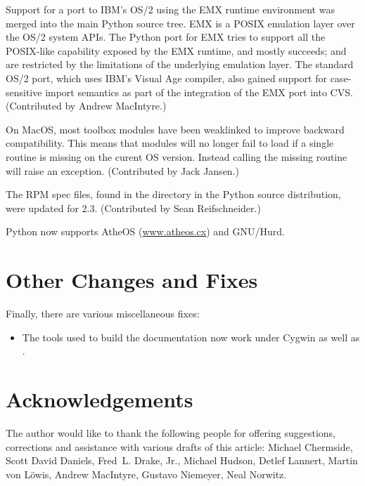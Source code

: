 \documentclass{howto}
\begin{document}
Support for a port to IBM's OS/2 using the EMX runtime environment was
merged into the main Python source tree.  EMX is a POSIX emulation
layer over the OS/2 system APIs.  The Python port for EMX tries to
support all the POSIX-like capability exposed by the EMX runtime, and
mostly succeeds;  and  are
restricted by the limitations of the underlying emulation layer.  The
standard OS/2 port, which uses IBM's Visual Age compiler, also gained
support for case-sensitive import semantics as part of the integration
of the EMX port into CVS.  (Contributed by Andrew MacIntyre.)

On MacOS, most toolbox modules have been weaklinked to improve
backward compatibility.  This means that modules will no longer fail
to load if a single routine is missing on the curent OS version.
Instead calling the missing routine will raise an exception.
(Contributed by Jack Jansen.)

The RPM spec files, found in the  directory in the
Python source distribution, were updated for 2.3.  (Contributed by
Sean Reifschneider.)

Python now supports AtheOS (\url{www.atheos.cx}) and GNU/Hurd.


\section{Other Changes and Fixes}

Finally, there are various miscellaneous fixes:

\begin{itemize}

\item The tools used to build the documentation now work under Cygwin
as well as \UNIX.

\end{itemize}


\section{Acknowledgements \label{acks}}

The author would like to thank the following people for offering
suggestions, corrections and assistance with various drafts of this
article: Michael Chermside, Scott David Daniels, Fred~L. Drake, Jr.,
Michael Hudson, Detlef Lannert, Martin von L\"owis, Andrew MacIntyre,
Gustavo Niemeyer, Neal Norwitz.
\end{document}
